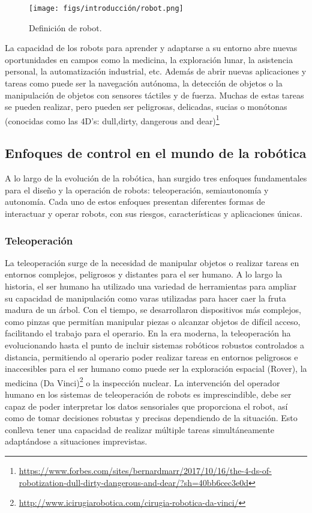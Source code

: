 \begin{figure} [H]
  \begin{center}
    \texttt{[image: figs/introducción/robot.png]}
  \end{center}
  \caption{Definición de robot.}
  \label{fig:robot}
  \vspace{-1.5em}
\end{figure}

La capacidad de los robots para aprender y adaptarse a su entorno abre nuevas oportunidades en campos como la medicina, la exploración lunar, la asistencia personal, la automatización industrial, etc. 
Además de abrir nuevas aplicaciones y tareas como puede ser la navegación autónoma, la detección de objetos o 
la manipulación de objetos con sensores táctiles y de fuerza. Muchas de estas tareas se pueden realizar, pero pueden ser peligrosas, delicadas, sucias o monótonas 
(conocidas como las 4D's: dull,dirty, dangerous and dear)\footnote{\url{https://www.forbes.com/sites/bernardmarr/2017/10/16/the-4-ds-of-robotization-dull-dirty-dangerous-and-dear/?sh=40bb6cec3e0d}}


 \subsection{Enfoques de control en el mundo de la robótica}
 \label{sec:enfoquesrobotica}
A lo largo de la evolución de la robótica, han surgido tres enfoques fundamentales para el diseño y la operación de robots: teleoperación, semiautonomía y autonomía.
Cada uno de estos enfoques presentan diferentes
formas de interactuar y operar robots, con sus riesgos, características y aplicaciones únicas. 
\subsubsection{Teleoperación}
\label{sec:subseccion}

La teleoperación surge de la necesidad de manipular objetos o realizar tareas en entornos complejos, peligrosos y distantes para el ser humano. A lo largo la historia, el ser humano
ha utilizado una variedad de herramientas para ampliar su capacidad de manipulación como varas utilizadas para hacer caer la fruta madura de un árbol. Con el tiempo, se desarrollaron 
dispositivos más complejos, como pinzas que permitían manipular piezas o alcanzar objetos de difícil acceso, facilitando el trabajo para el operario. En la era moderna, la teleoperación
ha evolucionando hasta el punto de incluir sistemas robóticos robustos controlados a distancia, permitiendo al operario poder realizar
tareas en entornos peligrosos e inaccesibles para el ser humano como puede ser la exploración espacial (Rover), la medicina (Da Vinci)\footnote{\url{http://www.icirugiarobotica.com/cirugia-robotica-da-vinci/}} o la inspección nuclear.
La intervención del operador humano en los sistemas de teleoperación de robots es imprescindible, debe ser capaz de poder interpretar los datos sensoriales que proporciona el robot, así como de 
tomar decisiones robustas y precisas dependiendo de la situación. Esto conlleva tener una capacidad de realizar múltiple tareas simultáneamente adaptándose a situaciones imprevistas.

